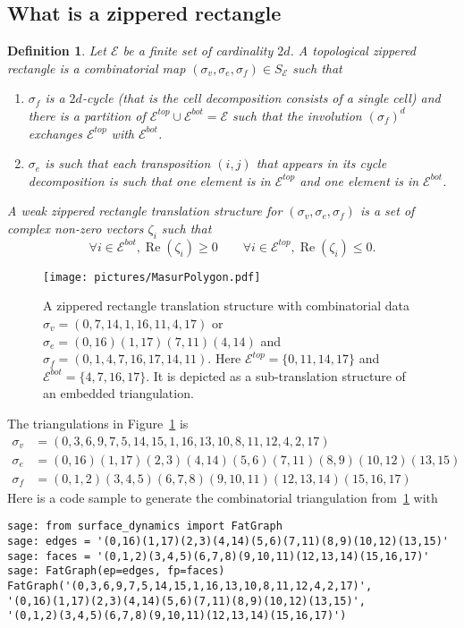 \documentclass{article}
\def\cE{\mathcal{E}}
\def\Re{\operatorname{Re}}
\newtheorem{definition}{Definition}
\begin{document}
\subsection{What is a zippered rectangle}
\begin{definition}
Let $\cE$ be a finite set of cardinality $2d$.
A \emph{topological zippered rectangle} is a combinatorial map $(\sigma_v, \sigma_e, \sigma_f) \in S_\cE$ such that
\begin{enumerate}
\item $\sigma_f$ is a $2d$-cycle (that is the cell decomposition consists of a single cell) and there is a partition of $\cE^{top} \cup \cE^{bot} = \cE$ such
that the involution $(\sigma_f)^d$ exchanges $\cE^{top}$ with $\cE^{bot}$.
\item $\sigma_e$ is such that each transposition $(i,j)$ that appears in its cycle
decomposition is such that one element is in $\cE^{top}$ and one element is in $\cE^{bot}$.
\end{enumerate}
A \emph{weak zippered rectangle translation structure} for $(\sigma_v, \sigma_e, \sigma_f)$ is
a set of complex non-zero vectors $\zeta_i$ such that
\[
\forall i \in \cE^{bot}, \Re(\zeta_i) \geq 0
\qquad
\forall i \in \cE^{top}, \Re(\zeta_i) \leq 0.
\]
\end{definition}
\begin{figure}[!ht]
\begin{center}\texttt{[image: pictures/MasurPolygon.pdf]}\end{center}
\caption{A zippered rectangle translation structure with combinatorial data
$\sigma_v = (0,7,14,1,16,11,4,17)$ or
$\sigma_e = (0,16)(1,17)(7,11)(4,14)$ and
$\sigma_f = (0,1,4,7,16,17,14,11)$. Here $\cE^{top} = \{0,11,14,17\}$ and $\cE^{bot} = \{4,7,16,17\}$. It is depicted as a sub-translation structure of an embedded triangulation.}
\label{fig:TriangulationYoccoz}
\end{figure}
The triangulations in Figure~\ref{fig:TriangulationYoccoz} is
\begin{align*}
\sigma_v &= (0,3,6,9,7,5,14,15,1,16,13,10,8,11,12,4,2,17) \\
\sigma_e &= (0,16)(1,17)(2,3)(4,14)(5,6)(7,11)(8,9)(10,12)(13,15) \\
\sigma_f &= (0,1,2)(3,4,5)(6,7,8)(9,10,11)(12,13,14)(15,16,17)
\end{align*}
Here is a code sample to generate the combinatorial triangulation from~\ref{fig:TriangulationYoccoz} with \cite{surface-dynamics}
\begin{verbatim}
sage: from surface_dynamics import FatGraph
sage: edges = '(0,16)(1,17)(2,3)(4,14)(5,6)(7,11)(8,9)(10,12)(13,15)'
sage: faces = '(0,1,2)(3,4,5)(6,7,8)(9,10,11)(12,13,14)(15,16,17)'
sage: FatGraph(ep=edges, fp=faces)
FatGraph('(0,3,6,9,7,5,14,15,1,16,13,10,8,11,12,4,2,17)',
'(0,16)(1,17)(2,3)(4,14)(5,6)(7,11)(8,9)(10,12)(13,15)', 
'(0,1,2)(3,4,5)(6,7,8)(9,10,11)(12,13,14)(15,16,17)')
\end{verbatim}
\end{document}
